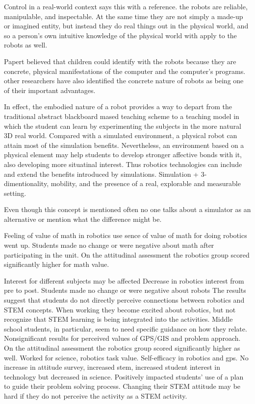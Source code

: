 \bigskip\noindent
Control in a real-world context
\cite{silk2011resources} says this with a reference. the robots are reliable, manipulable, and inspectable. At the same time they are not simply a made-up or imagined entity, but instead they do real things out in the physical world, and so a person's own intuitive knowledge of the physical world with apply to the robots as well. 

\cite{barker2007robotics} Papert believed that children could identify with the robots because they are concrete, physical manifestations of the computer and the computer's programs. other researchers have also identified the concrete nature of robots as being one of their important advantages. 

\cite{mitnik2009collaborative} In effect, the embodied nature of a robot provides a way to depart from the traditional abstract blackboard mased teaching scheme to a teaching model in which the student can learn by experimenting the subjects in the more natural 3D real world. Compared with a simulated environment, a physical robot can attain most of the simulation benefits. Nevertheless, an environment based on a physical element may help students to develop stronger affective bonds with it, also developing more situatinal interest. Thus robotics technologies can include and extend the benefits introduced by simulations. Simulation + 3-dimentionality, mobility, and the presence of a real, explorable and measurable setting. 

Even though this concept is mentioned often no one talks about a simulator as an alternative or mention what the difference might be. 

\bigskip\noindent
Feeling of value of math in robotics use
\cite{silk2011resources} sence of value of math for doing robotics went up. 
\cite{silk2011resources}Students made no change or were negative about math after participating in the unit. 
\cite{nugent2009use} On the attitudinal assessment the robotics group scored significantly higher for math value.

\bigskip\noindent
Interest for different subjects may be affected
\cite{silk2011resources} Decrease in robotics interest from pre to post. 
\cite{silk2011resources} Students made no change or were negative about robots
\cite{nugent2008effect} The results suggest that students do not directly perceive connections between robotics and STEM concepts. When working they become excited about robotics, but not recognize that STEM learning is being integrated into the activities. Middle school students, in particular, seem to need specific guidance on how they relate. 
\cite{nugent2009use} Nonsignificant results for perceived values of GPS/GIS and problem approach.
\cite{nugent2009use}On the attitudinal assessment the robotics group scored significantly higher as well. Worked for science, robotics task value. Self-efficacy in robotics and gps. 
\cite{nugent2008effect} No increase in attitude survey, increased stem, increased student interest in technology but decreased in science. Positively impacted students’ use of a plan to guide their problem solving process. Changing their STEM attitude may be hard if they do not perceive the activity as a STEM activity.

